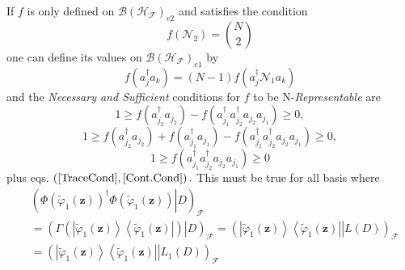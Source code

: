 \documentclass[aps,preprint]{revtex4}%
\begin{document}
If $f$ is only defined on $\mathcal{B}\left(  \mathcal{H}_{\mathcal{F}%
}\right)  _{e2}$ and satisfies the condition
\begin{equation}
f\left(  \mathcal{N}_{2}\right)  =\binom{N}{2} \label{TraceCond}%
\end{equation}
one can define its values on $\mathcal{B}\left(  \mathcal{H}_{\mathcal{F}%
}\right)  _{e1}$ by
\begin{equation}
f\left(  a_{j}^{\dagger}a_{k}\right)  =\left(  N-1\right)  f\left(
a_{j}^{\dagger}\mathcal{N}_{1}a_{k}\right)  \label{Cont.Cond}%
\end{equation}
and the \emph{Necessary and Sufficient} conditions for $f$ to be
N-\emph{Representable }are \emph{ }%
\begin{equation}
1\geq f\left(  a_{j_{2}}^{\dagger}a_{j_{2}}\right)  -f\left(  a_{j_{1}%
}^{\dagger}a_{j_{2}}^{\dagger}a_{j_{2}}a_{j_{1}}\right)  \geq0,
\end{equation}%
\begin{equation}
1\geq f\left(  a_{j_{2}}^{\dagger}a_{j_{2}}\right)  +f\left(  a_{j_{1}%
}^{\dagger}a_{j_{1}}\right)  -f\left(  a_{j_{1}}^{\dagger}a_{j_{2}}^{\dagger
}a_{j_{2}}a_{j_{1}}\right)  \geq0,
\end{equation}%
\begin{equation}
1\geq f\left(  a_{j_{1}}^{\dagger}a_{j_{2}}^{\dagger}a_{j_{2}}a_{j_{1}%
}\right)  \geq0
\end{equation}
plus eqs. $\left(  \ref{TraceCond},\ref{Cont.Cond}\right)  .$ This must be
true for all basis where
\begin{align}
&  \left(  \left.  \Phi\left(  \tilde{\varphi}_{1}\left(  \mathbf{z}\right)
\right)  ^{\dagger}\Phi\left(  \tilde{\varphi}_{1}\left(  \mathbf{z}\right)
\right)  \right\vert D\right)  _{\mathcal{F}}\nonumber\\
&  =\left(  \left.  \Gamma\left(  \left\vert \tilde{\varphi}_{1}\left(
\mathbf{z}\right)  \right\rangle \left\langle \tilde{\varphi}_{1}\left(
\mathbf{z}\right)  \right\vert \right)  \right\vert D\right)  _{\mathcal{F}%
}=\left(  \left.  \left\vert \tilde{\varphi}_{1}\left(  \mathbf{z}\right)
\right\rangle \left\langle \tilde{\varphi}_{1}\left(  \mathbf{z}\right)
\right\vert \right\vert L\left(  D\right)  \right)  _{\mathcal{F}}\nonumber\\
&  =\left(  \left.  \left\vert \tilde{\varphi}_{1}\left(  \mathbf{z}\right)
\right\rangle \left\langle \tilde{\varphi}_{1}\left(  \mathbf{z}\right)
\right\vert \right\vert L_{1}\left(  D\right)  \right)  _{\mathcal{F}}%
\end{align}
\end{document}
